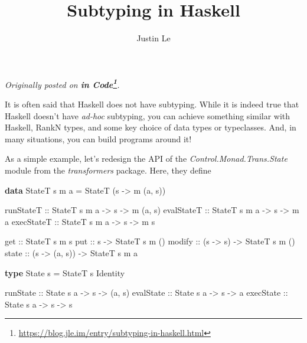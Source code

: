 \documentclass[]{article}
\title{Subtyping in Haskell}
\author{Justin Le}
\newenvironment{Shaded}{}{}
\newcommand{\KeywordTok}[1]{\textcolor[rgb]{0.00,0.44,0.13}{\textbf{#1}}}
\newcommand{\DataTypeTok}[1]{\textcolor[rgb]{0.56,0.13,0.00}{#1}}
\newcommand{\OtherTok}[1]{\textcolor[rgb]{0.00,0.44,0.13}{#1}}
\newcommand{\FunctionTok}[1]{\textcolor[rgb]{0.02,0.16,0.49}{#1}}
\newcommand{\NormalTok}[1]{#1}
\renewcommand{\href}[2]{#2\footnote{\url{#1}}}
\begin{document}
\maketitle

\emph{Originally posted on
\textbf{\href{https://blog.jle.im/entry/subtyping-in-haskell.html}{in Code}}.}

It is often said that Haskell does not have subtyping. While it is indeed true
that Haskell doesn't have \emph{ad-hoc} subtyping, you can achieve something
similar with Haskell, RankN types, and some key choice of data types or
typeclasses. And, in many situations, you can build programs around it!

As a simple example, let's redesign the API of the
\emph{Control.Monad.Trans.State} module from the \emph{transformers} package.
Here, they define

\begin{Shaded}
\begin{Highlighting}[]
\KeywordTok{data} \DataTypeTok{StateT}\NormalTok{ s m a }\FunctionTok{=} \DataTypeTok{StateT}\NormalTok{ (s }\OtherTok{->}\NormalTok{ m (a, s))}

\OtherTok{runStateT  ::} \DataTypeTok{StateT}\NormalTok{ s m a }\OtherTok{->}\NormalTok{ s }\OtherTok{->}\NormalTok{ m (a, s)}
\OtherTok{evalStateT ::} \DataTypeTok{StateT}\NormalTok{ s m a }\OtherTok{->}\NormalTok{ s }\OtherTok{->}\NormalTok{ m a}
\OtherTok{execStateT ::} \DataTypeTok{StateT}\NormalTok{ s m a }\OtherTok{->}\NormalTok{ s }\OtherTok{->}\NormalTok{ m s}

\OtherTok{get    ::}                  \DataTypeTok{StateT}\NormalTok{ s m s}
\OtherTok{put    ::}\NormalTok{ s             }\OtherTok{->} \DataTypeTok{StateT}\NormalTok{ s m ()}
\OtherTok{modify ::}\NormalTok{ (s }\OtherTok{->}\NormalTok{ s)      }\OtherTok{->} \DataTypeTok{StateT}\NormalTok{ s m ()}
\OtherTok{state  ::}\NormalTok{ (s }\OtherTok{->}\NormalTok{ (a, s)) }\OtherTok{->} \DataTypeTok{StateT}\NormalTok{ s m a}

\KeywordTok{type} \DataTypeTok{State}\NormalTok{ s }\FunctionTok{=} \DataTypeTok{StateT}\NormalTok{ s }\DataTypeTok{Identity}

\OtherTok{runState  ::} \DataTypeTok{State}\NormalTok{ s a  }\OtherTok{->}\NormalTok{ s }\OtherTok{->}\NormalTok{ (a, s)}
\OtherTok{evalState ::} \DataTypeTok{State}\NormalTok{ s a }\OtherTok{->}\NormalTok{ s }\OtherTok{->}\NormalTok{ a}
\OtherTok{execState ::} \DataTypeTok{State}\NormalTok{ s a }\OtherTok{->}\NormalTok{ s }\OtherTok{->}\NormalTok{ s}
\end{Highlighting}
\end{Shaded}
\end{document}
